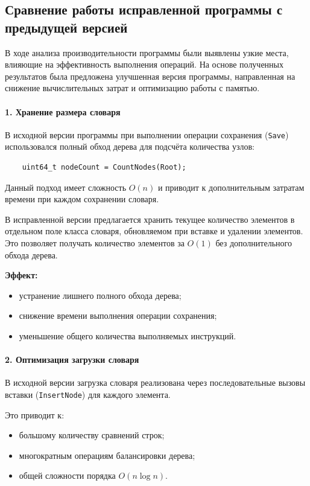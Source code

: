 \documentclass[12pt]{article}
\begin{document}
\subsection*{Сравнение работы исправленной программы с предыдущей версией}

В ходе анализа производительности программы были выявлены узкие места, влияющие на эффективность выполнения операций. На основе полученных результатов была предложена улучшенная версия программы, направленная на снижение вычислительных затрат и оптимизацию работы с памятью.

\paragraph{1. Хранение размера словаря}

В исходной версии программы при выполнении операции сохранения (\texttt{Save}) использовался полный обход дерева для подсчёта количества узлов:

\begin{verbatim}
	uint64_t nodeCount = CountNodes(Root);
\end{verbatim}

Данный подход имеет сложность $O(n)$ и приводит к дополнительным затратам времени при каждом сохранении словаря.

В исправленной версии предлагается хранить текущее количество элементов в отдельном поле класса словаря, обновляемом при вставке и удалении элементов. Это позволяет получать количество элементов за $O(1)$ без дополнительного обхода дерева.

\textbf{Эффект:}
\begin{itemize}
	\item устранение лишнего полного обхода дерева;
	\item снижение времени выполнения операции сохранения;
	\item уменьшение общего количества выполняемых инструкций.
\end{itemize}

\paragraph{2. Оптимизация загрузки словаря}

В исходной версии загрузка словаря реализована через последовательные вызовы вставки (\texttt{InsertNode}) для каждого элемента.

Это приводит к:
\begin{itemize}
	\item большому количеству сравнений строк;
	\item многократным операциям балансировки дерева;
	\item общей сложности порядка $O(n \log n)$.
\end{itemize}
\end{document}
